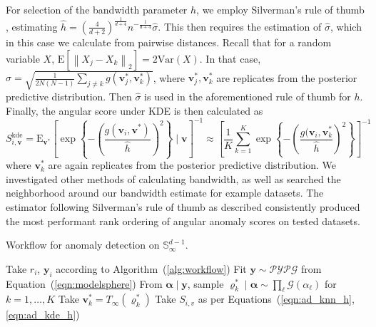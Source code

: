For selection of the bandwidth parameter $h$, we employ Silverman's rule of
    thumb \citep{silverman2018}, estimating 
    $\hat{h} = \left(\frac{4}{d+2}\right)^{\frac{1}{d+4}}
        n^{-\frac{1}{d+4}}\hat{\sigma}$.
    This then requires the estimation of $\hat{\sigma}$, which in this case we
    calculate from pairwise distances.  Recall that for a random variable $X$,
    $\text{E}\left[\left\lVert X_j - X_k\right\rVert_2\right] 
        = 2\text{Var}(X)$.
    In that case, $\hat{\sigma} = 
        \sqrt{\frac{1}{2N(N-1)}\sum_{j\neq k}g(\bm{v}_j^*,\bm{v}_k^*)}$, where
    $\bm{v}_j^*,\bm{v}_k^*$ are replicates from the posterior predictive distribution.
    Then $\hat{\sigma}$ is used in the aforementioned rule of thumb for $h$.
    Finally, the angular score under KDE is then calculated as
    \begin{equation}
    \label{eqn:ad_kde_h}
    S_{i,\bm{v}}^{\text{kde}} = \text{E}_{\bm{v}^*}\left[\exp\left\lbrace -
    \left(\frac{g(\bm{v}_i,\bm{v}^*)}{\hat{h}}\right)^2\right\rbrace\mid\bm{v}\right]^{-1}
    \approx
    \left[\frac{1}{K}\sum_{k = 1}^{K}
    \exp\left\lbrace-\left(\frac{g(\bm{v}_i,\bm{v}_k^*}{\hat{h}}\right)^2\right\rbrace\right]^{-1}
    \end{equation}
    where $\bm{v}_k^*$ are again replicates from the posterior predictive distribution.
    We investigated other methods of calculating bandwidth, as well as searched
    the neighborhood around our bandwidth estimate for example datasets.
    The estimator following Silverman's rule of thumb as described consistently 
    produced the most performant rank ordering of angular anomaly scores on 
    tested datasets.

\begin{algorithm}[htb]
    \caption{Workflow for anomaly detection on $\mathbb{S}_{\infty}^{d-1}$.}\label{alg:adreal}
    \begin{algorithmic}[1]
        \State Take $r_i$, $\bm{y}_i$ according to Algorithm~(\ref{alg:workflow})
        \State Fit $\bm{y}\sim\mathcal{PYPG}$ from Equation~(\ref{eqn:modelsphere})
        \State From $\bm{\alpha}\mid\bm{y}$, sample
            $\bm{\varrho}_k^{*}\mid\bm{\alpha}\sim\prod_{\ell}\mathcal{G}(\alpha_{\ell})$ for $k = 1,\ldots,K$
        \State Take $\bm{v}_k^{*} = T_{\infty}(\bm{\varrho}_k^{*})$
        \State Take $S_{i,v}$ as per Equations~(\ref{eqn:ad_knn_h},\ref{eqn:ad_kde_h})
    \end{algorithmic}
\end{algorithm}

